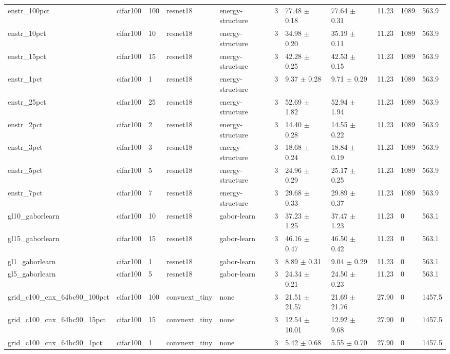 \begin{tabular}{lllllllllll}
enstr_100pct & cifar100 & 100 & resnet18 & energy-structure & 3 & 77.48 $\pm$ 0.18 & 77.64 $\pm$ 0.31 & 11.23 & 1089 & 563.9 \\
enstr_10pct & cifar100 & 10 & resnet18 & energy-structure & 3 & 34.98 $\pm$ 0.20 & 35.19 $\pm$ 0.11 & 11.23 & 1089 & 563.9 \\
enstr_15pct & cifar100 & 15 & resnet18 & energy-structure & 3 & 42.28 $\pm$ 0.25 & 42.53 $\pm$ 0.15 & 11.23 & 1089 & 563.9 \\
enstr_1pct & cifar100 & 1 & resnet18 & energy-structure & 3 & 9.37 $\pm$ 0.28 & 9.71 $\pm$ 0.29 & 11.23 & 1089 & 563.9 \\
enstr_25pct & cifar100 & 25 & resnet18 & energy-structure & 3 & 52.69 $\pm$ 1.82 & 52.94 $\pm$ 1.94 & 11.23 & 1089 & 563.9 \\
enstr_2pct & cifar100 & 2 & resnet18 & energy-structure & 3 & 14.40 $\pm$ 0.28 & 14.55 $\pm$ 0.22 & 11.23 & 1089 & 563.9 \\
enstr_3pct & cifar100 & 3 & resnet18 & energy-structure & 3 & 18.68 $\pm$ 0.24 & 18.84 $\pm$ 0.19 & 11.23 & 1089 & 563.9 \\
enstr_5pct & cifar100 & 5 & resnet18 & energy-structure & 3 & 24.96 $\pm$ 0.29 & 25.17 $\pm$ 0.25 & 11.23 & 1089 & 563.9 \\
enstr_7pct & cifar100 & 7 & resnet18 & energy-structure & 3 & 29.68 $\pm$ 0.33 & 29.89 $\pm$ 0.37 & 11.23 & 1089 & 563.9 \\
gl10_gaborlearn & cifar100 & 10 & resnet18 & gabor-learn & 3 & 37.23 $\pm$ 1.25 & 37.47 $\pm$ 1.23 & 11.23 & 0 & 563.1 \\
gl15_gaborlearn & cifar100 & 15 & resnet18 & gabor-learn & 3 & 46.16 $\pm$ 0.47 & 46.50 $\pm$ 0.42 & 11.23 & 0 & 563.1 \\
gl1_gaborlearn & cifar100 & 1 & resnet18 & gabor-learn & 3 & 8.89 $\pm$ 0.31 & 9.04 $\pm$ 0.29 & 11.23 & 0 & 563.1 \\
gl5_gaborlearn & cifar100 & 5 & resnet18 & gabor-learn & 3 & 24.34 $\pm$ 0.21 & 24.50 $\pm$ 0.23 & 11.23 & 0 & 563.1 \\
grid_c100_cnx_64bc90_100pct & cifar100 & 100 & convnext_tiny & none & 3 & 21.51 $\pm$ 21.57 & 21.69 $\pm$ 21.76 & 27.90 & 0 & 1457.5 \\
grid_c100_cnx_64bc90_15pct & cifar100 & 15 & convnext_tiny & none & 3 & 12.54 $\pm$ 10.01 & 12.92 $\pm$ 9.68 & 27.90 & 0 & 1457.5 \\
grid_c100_cnx_64bc90_1pct & cifar100 & 1 & convnext_tiny & none & 3 & 5.42 $\pm$ 0.68 & 5.55 $\pm$ 0.70 & 27.90 & 0 & 1457.5 \\

\end{tabular}
